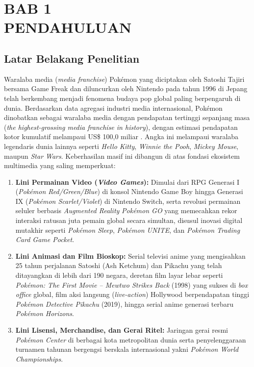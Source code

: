 \documentclass[12pt,a4paper]{article}
\numberwithin{equation}{section}
\numberwithin{table}{section}
\numberwithin{figure}{section}
\begin{document}
\setcounter{section}{0}
\section*{BAB 1\\[0.3cm]PENDAHULUAN}
\setcounter{section}{1}
\setcounter{subsection}{0}
\setcounter{table}{0}
\setcounter{figure}{0}
\setcounter{equation}{0}

\subsection{Latar Belakang Penelitian}

Waralaba media (\emph{media franchise}) Pok\'emon yang diciptakan oleh Satoshi Tajiri bersama Game Freak dan diluncurkan oleh Nintendo pada tahun 1996 di Jepang telah berkembang menjadi fenomena budaya pop global paling berpengaruh di dunia. Berdasarkan data agregasi industri media internasional, Pok\'emon dinobatkan sebagai waralaba media dengan pendapatan tertinggi sepanjang masa (\emph{the highest-grossing media franchise in history}), dengan estimasi pendapatan kotor kumulatif melampaui US\$ 100,0 miliar \citep{statista2024pokemon}. Angka ini melampaui waralaba legendaris dunia lainnya seperti \emph{Hello Kitty}, \emph{Winnie the Pooh}, \emph{Mickey Mouse}, maupun \emph{Star Wars}. Keberhasilan masif ini dibangun di atas fondasi ekosistem multimedia yang saling memperkuat:
\begin{enumerate}
  \item \textbf{Lini Permainan Video (\emph{Video Games}):} Dimulai dari RPG Generasi I (\emph{Pok\'emon Red/Green/Blue}) di konsol Nintendo Game Boy hingga Generasi IX (\emph{Pok\'emon Scarlet/Violet}) di Nintendo Switch, serta revolusi permainan seluler berbasis \emph{Augmented Reality} \emph{Pok\'emon GO} yang memecahkan rekor interaksi ratusan juta pemain global secara simultan, disusul inovasi digital mutakhir seperti \emph{Pok\'emon Sleep}, \emph{Pok\'emon UNITE}, dan \emph{Pok\'emon Trading Card Game Pocket}.
  \item \textbf{Lini Animasi dan Film Bioskop:} Serial televisi anime yang mengisahkan 25 tahun perjalanan Satoshi (Ash Ketchum) dan Pikachu yang telah ditayangkan di lebih dari 190 negara, deretan film layar lebar seperti \emph{Pok\'emon: The First Movie -- Mewtwo Strikes Back} (1998) yang sukses di \emph{box office} global, film aksi langsung (\emph{live-action}) Hollywood berpendapatan tinggi \emph{Pok\'emon Detective Pikachu} (2019), hingga serial anime generasi terbaru \emph{Pok\'emon Horizons}.
  \item \textbf{Lini Lisensi, Merchandise, dan Gerai Ritel:} Jaringan gerai resmi \emph{Pok\'emon Center} di berbagai kota metropolitan dunia serta penyelenggaraan turnamen tahunan bergengsi berskala internasional yakni \emph{Pok\'emon World Championships}.
\end{enumerate}
\end{document}
